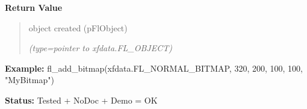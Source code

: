 \begin{boxedminipage}{\funcwidth}
\begin{quote}
      \end{quote}

      \textbf{Return Value}
    \vspace{-1ex}

      \begin{quote}
      object created (pFlObject)

      {\it (type=pointer to xfdata.FL\_OBJECT)}

      \end{quote}

\textbf{Example:} fl\_add\_bitmap(xfdata.FL\_NORMAL\_BITMAP, 320, 200, 100, 100,         
"MyBitmap")



\textbf{Status:} Tested + NoDoc + Demo = OK



    \end{boxedminipage}

    \label{xformslib:flbitmap:fl_set_bitmap_data}

    \vspace{0.5ex}


